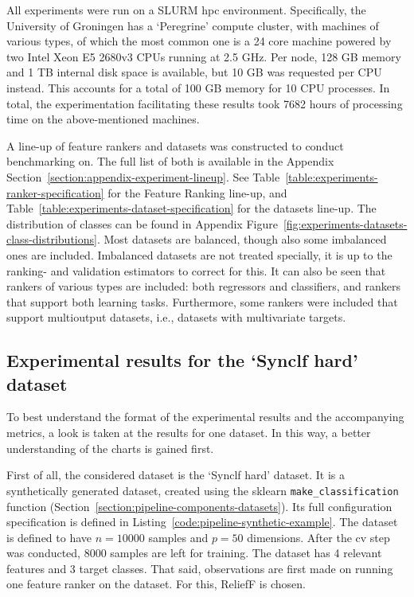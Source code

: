 \documentclass[../main.tex]{subfiles}
\begin{document}
All experiments were run on a SLURM \gls{hpc} environment. Specifically, the University of Groningen has a `Peregrine' compute cluster, with machines of various types, of which the most common one is a 24 core machine powered by two Intel Xeon E5 2680v3 CPUs running at 2.5 GHz. Per node, 128 GB memory and 1 TB internal disk space is available, but 10 GB was requested per CPU instead. This accounts for a total of 100 GB memory for 10 CPU processes. In total, the experimentation facilitating these results took 7682 hours of processing time on the above-mentioned machines.


A line-up of feature rankers and datasets was constructed to conduct benchmarking on. The full list of both is available in the Appendix Section~\ref{section:appendix-experiment-lineup}. See Table~\ref{table:experiments-ranker-specification} for the Feature Ranking line-up, and Table~\ref{table:experiments-dataset-specification} for the datasets line-up. The distribution of classes can be found in Appendix Figure~\ref{fig:experiments-datasets-class-distributions}. Most datasets are balanced, though also some imbalanced ones are included. Imbalanced datasets are not treated specially, it is up to the ranking- and validation estimators to correct for this. It can also be seen that rankers of various types are included: both regressors and classifiers, and rankers that support both learning tasks. Furthermore, some rankers were included that support multioutput datasets, i.e., datasets with multivariate targets.




\subsection{Experimental results for the `Synclf hard' dataset}\label{section:experiments-example}
To best understand the format of the experimental results and the accompanying metrics, a look is taken at the results for one dataset. In this way, a better understanding of the charts is gained first.

First of all, the considered dataset is the `Synclf hard' dataset. It is a synthetically generated dataset, created using the sklearn \texttt{make\_classification} function (Section~\ref{section:pipeline-components-datasets}). Its full configuration specification is defined in Listing~\ref{code:pipeline-synthetic-example}. The dataset is defined to have $n=10000$ samples and $p=50$ dimensions. After the \gls{cv} step was conducted, 8000 samples are left for training. The dataset has 4 relevant features and 3 target classes. That said, observations are first made on running one feature ranker on the dataset. For this, ReliefF \citep{kononenko_estimating_1994} is chosen.
    
\end{document}
